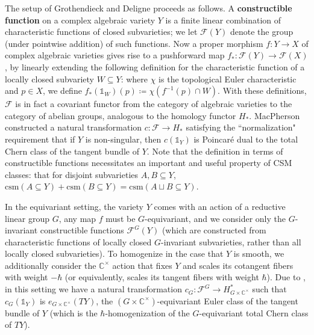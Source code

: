 \documentclass[reqno]{amsart}
\newcommand{\C}{\mathbb{C}}
\newcommand{\F}{\mathcal{F}}
\newcommand{\csm}{\textrm{csm}}
\numberwithin{equation}{section}
\theoremstyle{definition}
\theoremstyle{remark}
\begin{document}
The setup of Grothendieck and Deligne proceeds as follows. A \textbf{constructible function} on a complex algebraic variety $Y$ is a finite linear combination of characteristic functions of closed subvarieties; we let $\mathcal{F}(Y)$ denote the group (under pointwise addition) of such functions. Now a proper morphism $f:Y \to X$ of complex algebraic varieties gives rise to a pushforward map $f_*:\mathcal{F}(Y) \to \mathcal{F}(X)$, by linearly extending the following definition for the characteristic function of a locally closed subvariety $W \subseteq Y$: where $\chi$ is the topological Euler characteristic and $p \in X$, we define $f_*(\mathbb{1}_W)(p)\coloneqq \chi(f^{-1}(p) \cap W)$. With these definitions, $\mathcal{F}$ is in fact a covariant functor from the category of algebraic varieties to the category of abelian groups, analogous to the homology functor $H_*$. MacPherson constructed a natural transformation $c: \mathcal{F} \to H_*$ satisfying the ``normalization" requirement that if $Y$ is non-singular, then $c(\mathbb{1}_Y)$ is Poincar{\'e} dual to the total Chern class of the tangent bundle of $Y$.
Note that the definition in terms of constructible functions necessitates an important and useful property of CSM classes: that for disjoint subvarieties $A,B \subseteq Y$, $\csm(A \subseteq Y)+\csm(B \subseteq Y)=\csm(A \sqcup B \subseteq Y)$.

In the equivariant setting, the variety $Y$ comes with an action of a reductive linear group $G$, any map $f$ must be $G$-equivariant, and we consider only the $G$-invariant constructible functions $\F^G(Y)$ (which are constructed from characteristic functions of locally closed $G$-invariant subvarieties, rather than all locally closed subvarieties). To homogenize in the case that $Y$ is smooth, we additionally consider the $\C^\times$ action that fixes 
$Y$ and scales its cotangent fibers with weight $-\hbar$ (or equivalently, scales its tangent fibers with weight $\hbar$).
Due to \cite{ohm06}, in this setting we have a natural transformation $c_G: \mathcal{F}^{G} \to H^*_{G\times \C^\times}$ such that $c_G(\mathbb{1}_Y)$ is $e_{G\times \C^{\times}}(TY)$, the $(G\times \C^\times)$-equivariant Euler class of the tangent bundle of $Y$ (which is the $\hbar$-homogenization of the $G$-equivariant total Chern class of $TY$).
\end{document}
